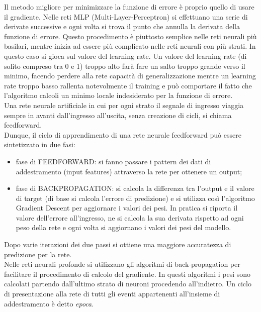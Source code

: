  Il metodo migliore per minimizzare la funzione di errore è proprio quello di usare il gradiente.
 Nelle reti MLP (Multi-Layer-Perceptron) si effettuano una serie di derivate successive e
  ogni volta si trova il punto che annulla la derivata della funzione di errore. Questo procedimento è 
  piuttosto semplice nelle reti neurali più basilari, mentre inizia ad essere più complicato
   nelle reti neurali con più strati. In questo caso si gioca sul valore del learning rate.
   Un valore del learning rate (di solito compreso tra 0 e 1) troppo alto farà fare un
    salto troppo grande verso il minimo, 
   facendo perdere alla rete capacità di generalizzazione mentre un learning rate troppo basso rallenta
    notevolmente il training e può comportare il fatto che l'algoritmo 
    calcoli un minimo locale indesiderato per la funzione di errore. \\
   
Una rete neurale artificiale in cui per ogni strato il segnale di ingresso viaggia
 sempre in avanti dall’ingresso all’uscita, senza creazione di cicli, si chiama feedforward. \\

Dunque, il ciclo di apprendimento di una rete neurale feedforward può essere sintetizzato in due fasi:
\begin{itemize}
\item fase di FEEDFORWARD: si fanno passare i pattern dei dati di addestramento (input features) 
attraverso la rete per ottenere un output;\\
\item fase di BACKPROPAGATION: si calcola la differenza tra l'output e il valore di
  target (di base si calcola l’errore di predizione) e si utilizza così l’algoritmo Gradient Descent 
  per aggiornare i valori dei pesi. In pratica si riporta il valore dell’errore all’ingresso, 
  ne si calcola la sua derivata rispetto ad ogni peso della rete e ogni volta si aggiornano i
   valori dei pesi del modello. 
\end{itemize}
 Dopo varie iterazioni dei due passi si ottiene una maggiore accuratezza di predizione per la rete. \\ 
 Nelle reti neurali profonde si utilizzano gli algoritmi di 
 back-propagation per facilitare il procedimento di calcolo del gradiente. In questi algoritmi
  i pesi sono calcolati partendo dall’ultimo strato di neuroni procedendo all’indietro.
   Un ciclo di presentazione alla rete di tutti gli eventi appartenenti all’insieme di 
   addestramento è detto \emph{epoca}. \\
 
